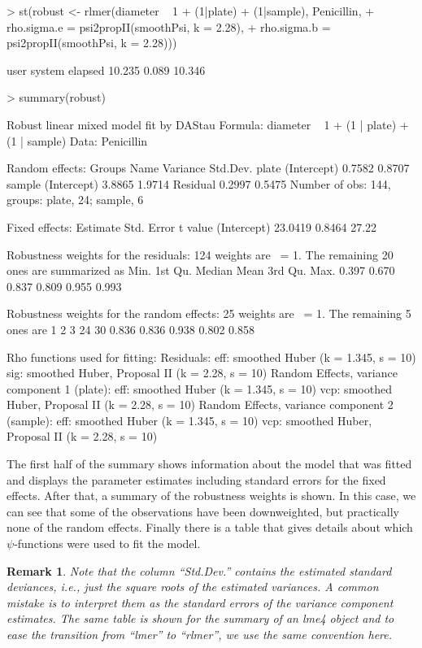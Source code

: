 \documentclass[11pt, a4paper]{article}
\renewenvironment{Schunk}{\vspace{\topsep}}{\vspace{\topsep}}
\theoremstyle{note}
\newtheorem*{remark}{Remark}
\begin{document}
\begin{Schunk}
\begin{Sinput}
> st(robust <- rlmer(diameter ~ 1 + (1|plate) + (1|sample), Penicillin,
+                    rho.sigma.e = psi2propII(smoothPsi, k = 2.28),
+                    rho.sigma.b = psi2propII(smoothPsi, k = 2.28)))
\end{Sinput}
\begin{Soutput}
   user  system elapsed 
 10.235   0.089  10.346 
\end{Soutput}
\begin{Sinput}
> summary(robust)
\end{Sinput}
\begin{Soutput}
Robust linear mixed model fit by DAStau 
Formula: diameter ~ 1 + (1 | plate) + (1 | sample) 
   Data: Penicillin 

Random effects:
 Groups   Name        Variance Std.Dev.
 plate    (Intercept) 0.7582   0.8707  
 sample   (Intercept) 3.8865   1.9714  
 Residual             0.2997   0.5475  
Number of obs: 144, groups: plate, 24; sample, 6

Fixed effects:
            Estimate Std. Error t value
(Intercept)  23.0419     0.8464   27.22

Robustness weights for the residuals: 
 124 weights are ~= 1. The remaining 20 ones are summarized as
   Min. 1st Qu.  Median    Mean 3rd Qu.    Max. 
  0.397   0.670   0.837   0.809   0.955   0.993 

Robustness weights for the random effects: 
 25 weights are ~= 1. The remaining 5 ones are
    1     2     3    24    30 
0.836 0.836 0.938 0.802 0.858 

Rho functions used for fitting:
  Residuals:
    eff: smoothed Huber (k = 1.345, s = 10) 
    sig: smoothed Huber, Proposal II (k = 2.28, s = 10) 
  Random Effects, variance component 1 (plate):
    eff: smoothed Huber (k = 1.345, s = 10) 
    vcp: smoothed Huber, Proposal II (k = 2.28, s = 10) 
  Random Effects, variance component 2 (sample):
    eff: smoothed Huber (k = 1.345, s = 10) 
    vcp: smoothed Huber, Proposal II (k = 2.28, s = 10) 
\end{Soutput}
\end{Schunk}

The first half of the summary shows information about the model that was
fitted and displays the parameter estimates including standard errors for
the fixed effects. After that, a summary of the robustness weights is
shown. In this case, we can see that some of the observations have been
downweighted, but practically none of the random effects. Finally there is
a table that gives details about which $\psi$-functions were used to fit
the model.
\begin{remark}
  Note that the column ``Std.Dev.'' contains the estimated standard
  deviances, i.e., just the square roots of the estimated variances. A
  common mistake is to interpret them as the standard errors of the
  variance component estimates. The same table is shown for the summary of
  an lme4 object and to ease the transition from ``lmer'' to ``rlmer'', we use the
  same convention here.
\end{remark}
\end{document}
